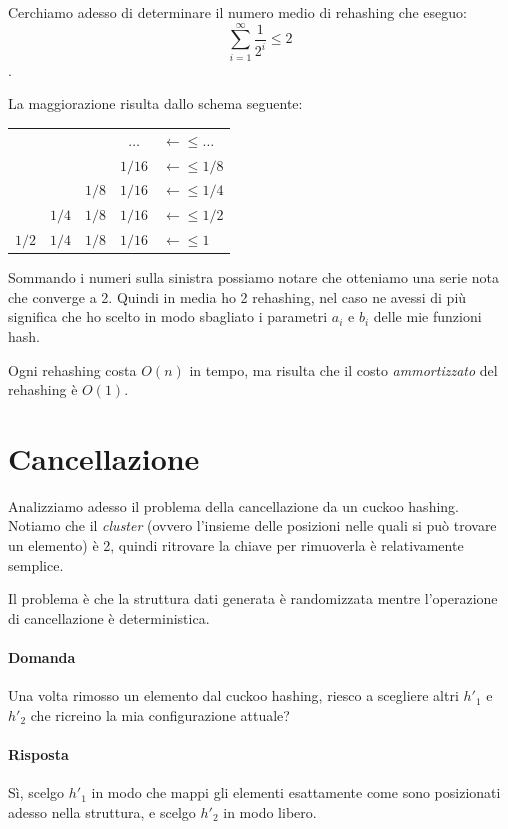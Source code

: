 \documentclass[a4paper,11pt]{book}
\begin{document}
Cerchiamo adesso di determinare il numero medio di rehashing che eseguo: $$\sum_{i=1}^{\infty}\frac{1}{2^i} \leq 2$$.

La maggiorazione risulta dallo schema seguente:
\begin{center}
\begin{tabular}{ccccl}
 & & & $\dots$ & $\longleftarrow \leq \dots$ \\
 & & & $1/16$ & $\longleftarrow \leq 1/8$ \\
 & & $1/8$& $1/16$ & $\longleftarrow \leq 1/4$ \\
 & $1/4$& $1/8$& $1/16$ & $\longleftarrow \leq 1/2$ \\
$1/2$ & $1/4$& $1/8$& $1/16$ & $\longleftarrow \leq 1$ \\
\end{tabular}
\end{center}

Sommando i numeri sulla sinistra possiamo notare che otteniamo una serie nota che converge a 2. Quindi in media ho 2 rehashing, nel caso ne avessi di pi\`u significa che ho scelto in modo sbagliato i parametri $a_i$ e $b_i$ delle mie funzioni hash.

Ogni rehashing costa $O(n)$ in tempo, ma risulta che il costo \emph{ammortizzato} del rehashing \`e $O(1)$.

\section{Cancellazione}

Analizziamo adesso il problema della cancellazione da un cuckoo hashing. Notiamo che il \emph{cluster} (ovvero l'insieme delle posizioni nelle quali si pu\`o trovare un elemento) \`e 2, quindi ritrovare la chiave per rimuoverla \`e relativamente semplice.

Il problema \`e che la struttura dati generata \`e randomizzata mentre l'operazione di cancellazione \`e deterministica.

\paragraph{Domanda} Una volta rimosso un elemento dal cuckoo hashing, riesco a scegliere altri $h'_1$ e $h'_2$ che ricreino la mia configurazione attuale?

\paragraph{Risposta} S\`i, scelgo $h'_1$ in modo che mappi gli elementi esattamente come sono posizionati adesso nella struttura, e scelgo $h'_2$ in modo libero.
\end{document}
